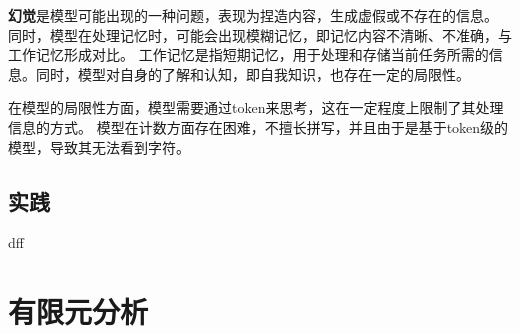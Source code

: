 \documentclass[12pt]{article}
\begin{document}
\textbf{幻觉}是模型可能出现的一种问题，表现为捏造内容，生成虚假或不存在的信息。
同时，模型在处理记忆时，可能会出现模糊记忆，即记忆内容不清晰、不准确，与工作记忆形成对比。
工作记忆是指短期记忆，用于处理和存储当前任务所需的信息。同时，模型对自身的了解和认知，即自我知识，也存在一定的局限性。

在模型的局限性方面，模型需要通过token来思考，这在一定程度上限制了其处理信息的方式。
模型在计数方面存在困难，不擅长拼写，并且由于是基于token级的模型，导致其无法看到字符。



\subsection{实践}


dff
\section{有限元分析}
\end{document}
